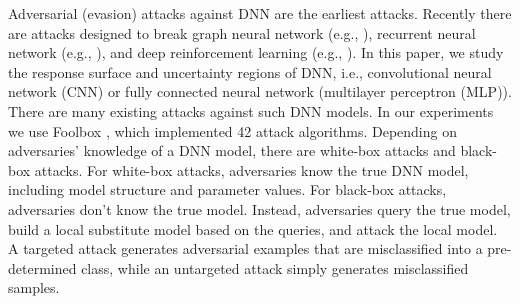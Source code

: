 \documentclass[12pt]{article}
\begin{document}
Adversarial (evasion) attacks against DNN are the earliest
attacks. Recently there are attacks designed to 
break graph neural network (e.g., \cite{attack-gnn-1,attack-gnn-2}),
recurrent neural network (e.g.,
\cite{attack-rnn-1,attack-rnn-2,attack-rnn-3,attack-rnn-4,attack-rnn-5}),
and deep reinforcement learning (e.g.,
\cite{attack-RL-1,attack-RL-2,attack-RL-3,attack-RL-4}).   
In this paper, we study the response surface and uncertainty
regions of DNN, i.e., convolutional neural network (CNN) or fully connected
neural network (multilayer perceptron (MLP)).
There are many existing attacks against such DNN
models. In our experiments we use Foolbox \cite{foolbox}, which implemented 42 attack
algorithms. Depending on adversaries' knowledge of a DNN model, there
are white-box attacks and black-box attacks. For white-box attacks,
adversaries know the true DNN model, including model structure and
parameter values. For black-box attacks, adversaries don't know the
true model. Instead, adversaries query the true model, build a
local substitute model based on the queries, and attack the local
model. A targeted attack generates adversarial examples
that are misclassified into a pre-determined class, while an
untargeted attack simply generates misclassified samples.  
\end{document}
